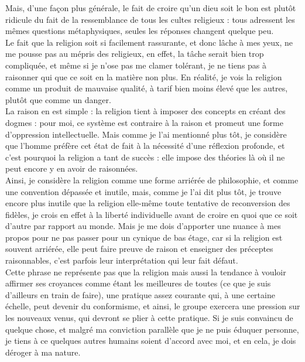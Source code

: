 \documentclass[12pt,a4paper]{article}
\begin{document}
{Mais, d'une façon plus générale, le fait de croire qu'un dieu soit le bon est plutôt ridicule du fait de la ressemblance de tous les cultes religieux : tous adressent les mêmes questions métaphysiques, seules les réponses changent quelque peu.\\

Le fait que la religion soit si facilement rassurante, et donc lâche à mes yeux, ne me pousse pas au mépris des religieux, en effet, la tâche serait bien trop compliquée, et même si je n'ose pas me clamer tolérant, je ne tiens pas à raisonner qui que ce soit en la matière non plus. En réalité, je vois la religion comme un produit de mauvaise qualité, à tarif bien moins élevé que les autres, plutôt que comme un danger.\\

La raison en est simple : la religion tient à imposer des concepts en créant des dogmes : pour moi, ce système est contraire à la raison et promeut une forme d'oppression intellectuelle. Mais comme je l'ai mentionné plus tôt, je considère que l'homme préfère cet état de fait à la nécessité d'une réflexion profonde, et c'est pourquoi la religion a tant de succès : elle impose des théories là où il ne peut encore y en avoir de raisonnées.\\

Ainsi, je considère la religion comme une forme arriérée de philosophie, et comme une convention dépassée et inutile, mais, comme je l'ai dit plus tôt, je trouve encore plus inutile que la religion elle-même toute tentative de reconversion des fidèles, je crois en effet à la liberté individuelle avant de croire en quoi que ce soit d'autre par rapport au monde. Mais je me dois d'apporter une nuance à mes propos pour ne pas passer pour un cynique de bas étage, car si la religion est souvent arriérée, elle peut faire preuve de raison et enseigner des préceptes raisonnables, c'est parfois leur interprétation qui leur fait défaut.\\

Cette phrase ne représente pas que la religion mais aussi la tendance à vouloir affirmer ses croyances comme étant les meilleures de toutes (ce que je suis d'ailleurs en train de faire), une pratique assez courante qui, à une certaine échelle, peut devenir du conformisme, et ainsi, le groupe exercera une pression sur les nouveaux venus, qui devront se plier à cette pratique. Si je suis convaincu de quelque chose, et malgré ma conviction parallèle que je ne puis éduquer personne, je tiens à ce quelques autres humains soient d'accord avec moi, et en cela, je dois déroger à ma nature.\\

}
\end{document}
